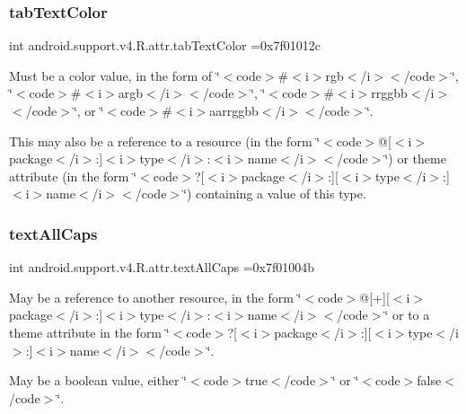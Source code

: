 \subsubsection{\texorpdfstring{tab\+Text\+Color}{tabTextColor}}
{\footnotesize\ttfamily int android.\+support.\+v4.\+R.\+attr.\+tab\+Text\+Color =0x7f01012c\hspace{0.3cm}{\ttfamily [static]}}

Must be a color value, in the form of \char`\"{}$<$code$>$\#$<$i$>$rgb$<$/i$>$$<$/code$>$\char`\"{}, \char`\"{}$<$code$>$\#$<$i$>$argb$<$/i$>$$<$/code$>$\char`\"{}, \char`\"{}$<$code$>$\#$<$i$>$rrggbb$<$/i$>$$<$/code$>$\char`\"{}, or \char`\"{}$<$code$>$\#$<$i$>$aarrggbb$<$/i$>$$<$/code$>$\char`\"{}. 

This may also be a reference to a resource (in the form \char`\"{}$<$code$>$@\mbox{[}$<$i$>$package$<$/i$>$\+:\mbox{]}$<$i$>$type$<$/i$>$\+:$<$i$>$name$<$/i$>$$<$/code$>$\char`\"{}) or theme attribute (in the form \char`\"{}$<$code$>$?\mbox{[}$<$i$>$package$<$/i$>$\+:\mbox{]}\mbox{[}$<$i$>$type$<$/i$>$\+:\mbox{]}$<$i$>$name$<$/i$>$$<$/code$>$\char`\"{}) containing a value of this type. \mbox{\label{classandroid_1_1support_1_1v4_1_1R_1_1attr_af49e1396fa93fb3c916d95b6b825adf7}} 
\subsubsection{\texorpdfstring{text\+All\+Caps}{textAllCaps}}
{\footnotesize\ttfamily int android.\+support.\+v4.\+R.\+attr.\+text\+All\+Caps =0x7f01004b\hspace{0.3cm}{\ttfamily [static]}}

May be a reference to another resource, in the form \char`\"{}$<$code$>$@\mbox{[}+\mbox{]}\mbox{[}$<$i$>$package$<$/i$>$\+:\mbox{]}$<$i$>$type$<$/i$>$\+:$<$i$>$name$<$/i$>$$<$/code$>$\char`\"{} or to a theme attribute in the form \char`\"{}$<$code$>$?\mbox{[}$<$i$>$package$<$/i$>$\+:\mbox{]}\mbox{[}$<$i$>$type$<$/i$>$\+:\mbox{]}$<$i$>$name$<$/i$>$$<$/code$>$\char`\"{}. 

May be a boolean value, either \char`\"{}$<$code$>$true$<$/code$>$\char`\"{} or \char`\"{}$<$code$>$false$<$/code$>$\char`\"{}. \mbox{\label{classandroid_1_1support_1_1v4_1_1R_1_1attr_ac95ce759329fc855718c6b3a61a764d8}} 
